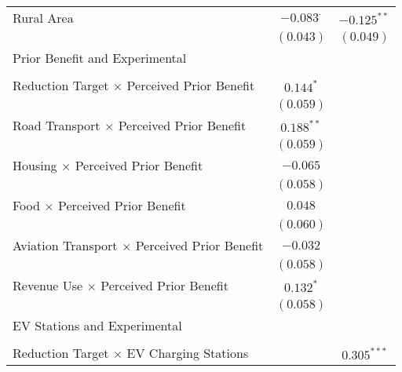 \begin{center}
\begin{tiny}
\begin{longtable}{l@{} c@{} c@{}}
Rural Area                                                & $-0.083^{\cdot}$ & $-0.125^{**}$    \\
                                                          & $(0.043)$        & $(0.049)$        \\
Prior Benefit and Experimental                            &                  &                  \\
                                                          &                  &                  \\
\quad Reduction Target $\times$ Perceived Prior Benefit   & $0.144^{*}$      &                  \\
                                                          & $(0.059)$        &                  \\
\quad Road Transport $\times$ Perceived Prior Benefit     & $0.188^{**}$     &                  \\
                                                          & $(0.059)$        &                  \\
\quad Housing $\times$ Perceived Prior Benefit            & $-0.065$         &                  \\
                                                          & $(0.058)$        &                  \\
\quad Food $\times$ Perceived Prior Benefit               & $0.048$          &                  \\
                                                          & $(0.060)$        &                  \\
\quad Aviation Transport $\times$ Perceived Prior Benefit & $-0.032$         &                  \\
                                                          & $(0.058)$        &                  \\
\quad Revenue Use $\times$ Perceived Prior Benefit        & $0.132^{*}$      &                  \\
                                                          & $(0.058)$        &                  \\
EV Stations and Experimental                              &                  &                  \\
                                                          &                  &                  \\
\quad Reduction Target $\times$ EV Charging Stations      &                  & $0.305^{***}$    \\

\end{longtable}
\end{tiny}
\end{center}
